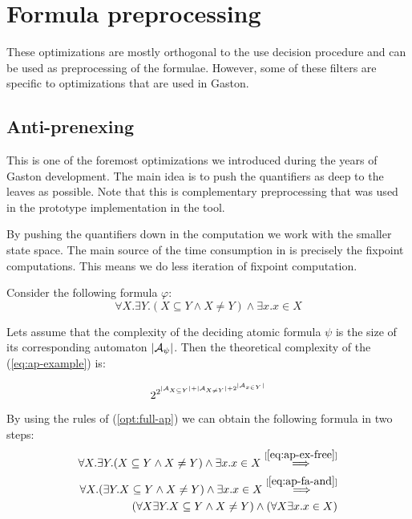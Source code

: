 \section{Formula preprocessing}
These optimizations are mostly orthogonal to the use decision 
procedure and can be used as preprocessing of the formulae.
However, some of these filters are specific to optimizations that
are used in Gaston.

  \subsection{Anti-prenexing}
  
  This is one of the foremost optimizations we introduced during the
  years of Gaston development. The main idea is to push the
  quantifiers as deep to the leaves as possible. Note that this is
  complementary preprocessing that was used in the prototype 
  implementation in the \dwina tool. 
  
   By pushing the quantifiers down in the computation
  we work with the smaller state space. The main source of the time consumption
  in \gaston is precisely the fixpoint computations. This means we do less 
  iteration of fixpoint computation.
  
   Consider the following formula $\varphi$:
  \begin{equation}
  \forall X. \exists Y. (X \subseteq Y \wedge X \neq Y) \wedge \exists x. x \in X \label{eq:ap-example}
  \end{equation}

  Lets assume that the complexity of the deciding atomic formula $\psi$ is the size of
  its corresponding automaton $|\mathcal{A}_{\psi}|$. Then the theoretical complexity of 
  the (\ref{eq:ap-example}) is:
  
  \begin{equation}
  2^{2^{|\mathcal{A}_{X \subseteq Y}| + |\mathcal{A}_{X \neq Y}| + 2^{|\mathcal{A}_{x \in Y}|}}}
  \end{equation}
  
  By using the rules of (\ref{opt:full-ap}) we can obtain the following formula in
  two steps:
  \begin{eqnarray}
  \forall X. \exists Y. (X \subseteq Y \wedge X \neq Y) \wedge \exists x. x \in X 
  	\overset{[\ref{eq:ap-ex-free}]}{\Longrightarrow}\\
  \forall X. (\exists Y. X \subseteq Y \wedge X \neq Y) \wedge \exists x. x \in X
  	\overset{[\ref{eq:ap-fa-and}]}{\Longrightarrow}\\
  (\forall X\exists Y. X \subseteq Y \wedge X \neq Y) \wedge (\forall X\exists x. x \in X)
  \end{eqnarray}
  
